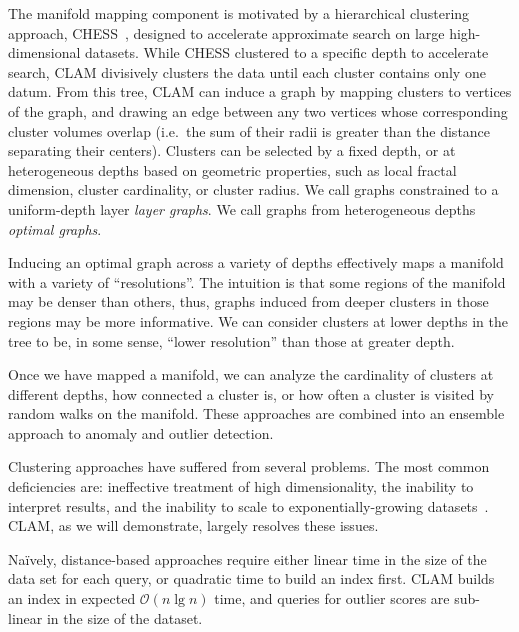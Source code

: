 The manifold mapping component is motivated by a hierarchical clustering approach, CHESS~\cite{ishaq2019clustered}, designed to accelerate approximate search on large high-dimensional datasets.
While CHESS clustered to a specific depth to accelerate search, CLAM
divisively clusters the data until each cluster contains only one datum.
From this tree, CLAM can induce a graph by mapping clusters to vertices of the graph, and drawing an edge between any two vertices whose corresponding cluster volumes overlap (i.e.\ the sum of their radii is greater than the distance separating their centers).
Clusters can be selected by a fixed depth, or at heterogeneous depths based on geometric properties, such as local fractal dimension, cluster cardinality, or cluster radius.
We call graphs constrained to a uniform-depth layer \textit{layer graphs}.
We call graphs from heterogeneous depths \textit{optimal graphs}.


Inducing an optimal graph across a variety of depths effectively maps a manifold with a variety of ``resolutions''.
The intuition is that some regions of the manifold may be denser than others, thus, graphs induced from deeper clusters in those regions may be more informative.
We can consider clusters at lower depths in the tree to be, in some sense, ``lower resolution'' than those at greater depth.

Once we have mapped a manifold, we can analyze the cardinality of clusters at different depths, how connected a cluster is, or how often a cluster is visited by random walks on the manifold.
These approaches are combined into an ensemble approach to anomaly and outlier detection.

Clustering approaches have suffered from several problems.
The most common deficiencies are:
ineffective treatment of high dimensionality,
the inability to interpret results, and
the inability to scale to exponentially-growing datasets~\cite{agrawal1998automatic}.
CLAM, as we will demonstrate, largely resolves these issues.

Na\"ively, distance-based approaches require either linear time in the size of the data set for each query,
or quadratic time to build an index first.
CLAM builds an index in expected $\mathcal{O}(n \lg n)$ time, and queries for outlier scores are sub-linear in the size of the dataset.
